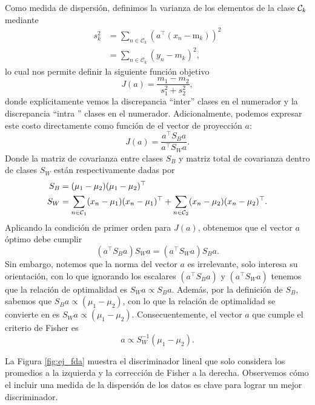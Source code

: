 Como medida de dispersión, definimos la varianza de los elementos de la clase ${\mathcal C}_k$ mediante
\begin{align}
	s_k^2 &= \sum_{n\in \mathcal{C}_k}(a^\top(x_n-\text{m}_k))^2\\
	&= \sum_{n\in \mathcal{C}_k}(y_n-m_k)^2,
\end{align}
lo cual nos permite definir la siguiente función objetivo
\begin{equation}
J(a) = \frac{m_1-m_2}{s_1^2+s_2 ^2},
\end{equation}
donde explícitamente vemos la discrepancia ``inter'' clases en el numerador y la discrepancia  ``intra '' clases en el numerador. Adicionalmente, podemos expresar este costo directamente como función de el vector de proyección $a$:
\begin{equation}
	J(a) = \frac{a^\top S_B a}{a^\top S_Wa}.
\end{equation}
Donde la matriz de covarianza entre clases $S_B$ y matriz total de covarianza dentro de clases $S_W$ están respectivamente dadas por
\begin{align}
	S_B &= (\mu_1-\mu_2)(\mu_1-\mu_2)^\top\\
	S_W &= \sum_{n\in {\mathcal C}_1}(x_n-\mu_1)(x_n-\mu_1)^\top +
	\sum_{n\in {\mathcal C}_2}(x_n-\mu_2)(x_n-\mu_2)^\top. 
\end{align}
Aplicando la condición de primer orden para $J(a)$, obtenemos que el vector $a$ óptimo debe cumplir
\begin{equation}
	(a^\top S_B a)S_W a = (a^\top S_W a)S_B a.	
\end{equation}
Sin embargo, notemos que la norma del vector  $a$ es irrelevante, solo interesa su orientación, con lo que  ignorando los escalares $(a^\top S_B a)$ y $(a^\top S_W a)$ tenemos que la relación de optimalidad es $S_W a \propto S_B a$. Además, por la definición de $S_B$, sabemos que $S_B a\propto(\mu_1-\mu_2)$, con lo que la relación de optimalidad se convierte en es $S_W a \propto (\mu_1-\mu_2)$. Consecuentemente, el vector $a$ que cumple el  criterio de Fisher es 
\begin{equation}
	a \propto S_W^{-1}(\mu_1-\mu_2).
\end{equation}

La Figura \ref{fig:ej_fda} muestra el  discriminador lineal que solo considera los promedios a la  izquierda y la corrección de Fisher a la derecha. Observemos cómo el incluir una medida de la dispersión de los datos es clave para lograr un mejor discriminador.


